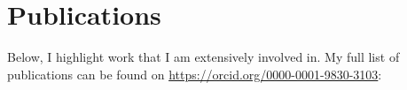 \section{Publications}
Below, I highlight work that I am extensively involved in. My full list of publications can be found on \url{https://orcid.org/0000-0001-9830-3103}: 


\begin{refsection}
\nocite{*}
\printbibliography[heading=none]
\end{refsection}

